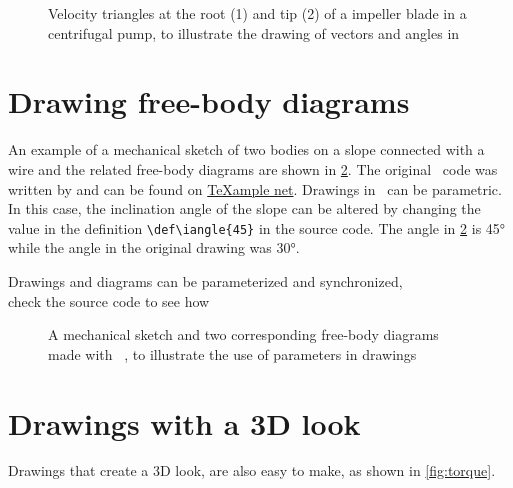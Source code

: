 \begin{figure}\centering
    
    \caption{Velocity triangles at the root (1) and tip (2) of a impeller blade in a centrifugal pump, to illustrate the drawing of vectors and angles in \TikZ}\label{f:centrifugalpump}
\end{figure}

\section{Drawing free-body diagrams}
An example of a mechanical sketch of two bodies on a slope connected with a wire and the related free-body diagrams are shown in \cref{fig:freebody}. The original \TikZ\ code was written by \cite{freebody} and can be found on \href{http://www.texample.net/tikz/examples/free-body-diagrams}{TeXample net}. Drawings in \TikZ\ can be parametric. In this case, the inclination angle of the slope can be altered by changing the value in the definition \verb|\def\iangle{45}| in the source code. The angle in \cref{fig:freebody} is \ang{45} while the angle in the original drawing was \ang{30}.

\begin{frame}{Drawings and diagrams can be parameterized and synchronized,\\ check the source code to see how}
    \begin{figure}[htb]\centering
        \caption{A mechanical sketch and two corresponding free-body diagrams made with \TikZ\ \parencite[adapted from][]{freebody}, to illustrate the use of parameters in drawings}\label{fig:freebody}
    \end{figure}
\end{frame}

\section{Drawings with a 3D look}
Drawings that create a 3D look, are also easy to make, as shown in \cref{fig:torque}.

